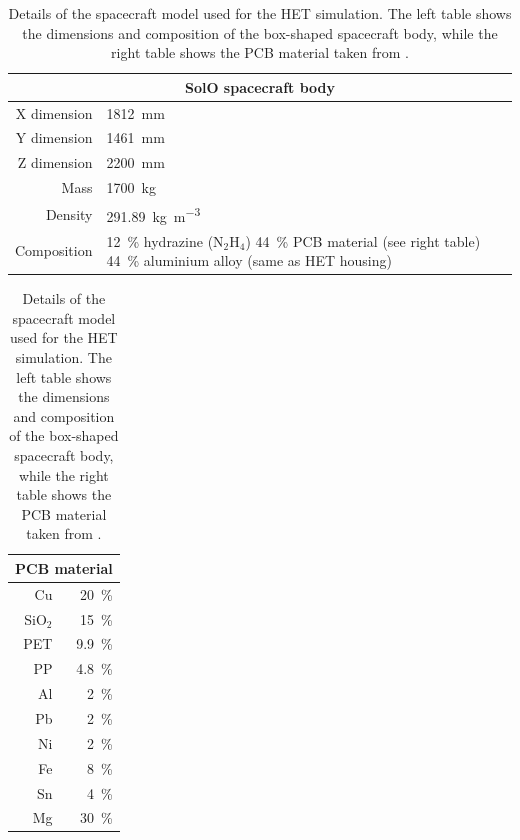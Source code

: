 \begin{table}
    \begin{tabular}{rp{6cm}}
        \toprule
        \multicolumn{2}{c}{\textbf{SolO spacecraft body}}                   \\
        \midrule
        X dimension & \SI{1812}{\milli\meter}                \\
        Y dimension & \SI{1461}{\milli\meter}                \\
        Z dimension & \SI{2200}{\milli\meter}                \\
        Mass        & \SI{1700}{\kilogram}                   \\
        Density     & \SI{291.89}{\kilogram\per\cubic\meter} \\
        Composition & \SI{12}{\percent} hydrazine (N$_2$H$_4$) \newline \SI{44}{\percent} \ac{PCB} material (see right table) \newline \SI{44}{\percent} aluminium alloy (same as \ac{HET} housing) \\
        \bottomrule
    \end{tabular}
    \hspace{1cm}
    \begin{tabular}{rr}
    	\toprule
    	\multicolumn{2}{c}{\textbf{\ac{PCB} material}} \\ \midrule
    	Cu      & \SI{20}{\percent}     \\
    	SiO$_2$ & \SI{15}{\percent}     \\
    	PET     & \SI{9.9}{\percent}    \\
    	PP      & \SI{4.8}{\percent}    \\
    	Al      & \SI{2}{\percent}      \\
    	Pb      & \SI{2}{\percent}      \\
    	Ni      & \SI{2}{\percent}      \\
    	Fe      & \SI{8}{\percent}      \\
    	Sn      & \SI{4}{\percent}      \\
    	Mg      & \SI{30}{\percent}     \\ \bottomrule
    \end{tabular}
    \caption{Details of the spacecraft model used for the \ac{HET} simulation. The left table shows the dimensions and composition of the box-shaped spacecraft body, while the right table shows the \ac{PCB} material taken from \citet{Appel-2018,Appel-2018-PhD}.}
    \label{tab:solo_spacecraft_gdml}
\end{table}

